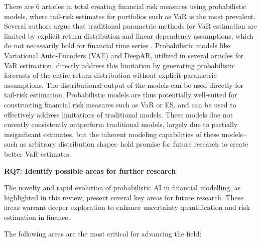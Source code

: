 There are 6 articles in total creating financial risk measures using probabilistic models, where tail-risk estimates for portfolios such as VaR is the most prevalent. Several authors argue that traditional parametric methods for VaR estimation are limited by explicit return distribution and linear dependency assumptions, which do not necessarily hold for financial time series \parencite{arian2022encoded,Fatouros2023DeepVaR}. Probabilistic models like Variational Auto-Encoders (VAE) and DeepAR, utilized in several articles for VaR estimation, directly address this limitation by generating probabilistic forecasts of the entire return distribution without explicit parametric assumptions. The distributional output of the models can be used directly for tail-risk estimation. Probabilistic models are thus potentially well-suited for constructing financial risk measures such as VaR or ES, and can be used to effectively address limitations of traditional models. These models due not curently consistently outperform traditional models, largely due to partially insignificant estimates, but the inherent modeling capabilities of these models--such as arbitrary distribution shapes--hold promise for future research to create better VaR estimates.

\textbf{RQ7: Identify possible areas for further research}\nopagebreak

The novelty and rapid evolution of probabilistic AI in financial modelling, as highlighted in this review, present several key areas for future research. These areas warrant deeper exploration to enhance uncertainty quantification and risk estimation in finance.

The following areas are the most critical for advancing the field:

